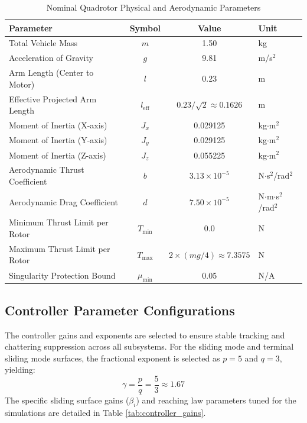 \begin{table}[h!]
\centering
\caption{Nominal Quadrotor Physical and Aerodynamic Parameters}
\label{tab:nominal_params}
\begin{tabular}{|l|c|c|l|}
\hline
\textbf{Parameter} & \textbf{Symbol} & \textbf{Value} & \textbf{Unit} \\
\hline
Total Vehicle Mass & $m$ & 1.50 & kg \\
Acceleration of Gravity & $g$ & 9.81 & m/s$^2$ \\
Arm Length (Center to Motor) & $l$ & 0.23 & m \\
Effective Projected Arm Length & $l_{\text{eff}}$ & $0.23 / \sqrt{2} \approx 0.1626$ & m \\
Moment of Inertia (X-axis) & $J_x$ & 0.029125 & kg$\cdot$m$^2$ \\
Moment of Inertia (Y-axis) & $J_y$ & 0.029125 & kg$\cdot$m$^2$ \\
Moment of Inertia (Z-axis) & $J_z$ & 0.055225 & kg$\cdot$m$^2$ \\
Aerodynamic Thrust Coefficient & $b$ & $3.13 \times 10^{-5}$ & N$\cdot$s$^2$/rad$^2$ \\
Aerodynamic Drag Coefficient & $d$ & $7.50 \times 10^{-5}$ & N$\cdot$m$\cdot$s$^2$/rad$^2$ \\
Minimum Thrust Limit per Rotor & $T_{\text{min}}$ & 0.0 & N \\
Maximum Thrust Limit per Rotor & $T_{\text{max}}$ & $2 \times (mg / 4) \approx 7.3575$ & N \\
Singularity Protection Bound & $\mu_{\text{min}}$ & 0.05 & N/A \\
\hline
\end{tabular}
\end{table}

\subsection{Controller Parameter Configurations}
The controller gains and exponents are selected to ensure stable tracking and chattering suppression across all subsystems. For the sliding mode and terminal sliding mode surfaces, the fractional exponent is selected as $p = 5$ and $q = 3$, yielding:
\begin{equation}
\gamma = \frac{p}{q} = \frac{5}{3} \approx 1.67
\end{equation}
The specific sliding surface gains ($\beta_i$) and reaching law parameters tuned for the simulations are detailed in Table \ref{tab:controller_gains}.


